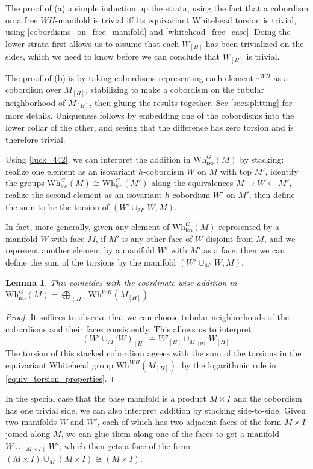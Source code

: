 \documentclass[11pt]{amsart}
\newtheorem{lem}{Lemma}[section]
\theoremstyle{definition}
\numberwithin{equation}{section}
\numberwithin{figure}{section}
\newcommand{\iso}{\mathrm{iso}}
\newcommand{\Wh}{\mathrm{Wh}}
\begin{document}
The proof of (a) a simple induction up the strata, using the fact that a cobordism on a free $WH$-manifold is trivial iff its equivariant Whitehead torsion is trivial, using \autoref{cobordisms_on_free_manifold} and \autoref{whitehead_free_case}. Doing the lower strata first allows us to assume that each $W_{[H]}$ has been trivialized on the sides, which we need to know before we can conclude that $W_{[H]}$ is trivial.

The proof of (b) is by taking cobordisms representing each element $\tau^{WH}$ as a cobordism over $M_{[H]}$, stabilizing to make a cobordism on the tubular neighborhood of $M_{[H]}$, then gluing the results together. See \autoref{sec:splitting} for more details. Uniqueness follows by embedding one of the cobordisms into the lower collar of the other, and seeing that the difference has zero torsion and is therefore trivial.

Using \autoref{luck_442}, we can interpret the addition in $\Wh^G_{\iso}(M)$ by stacking: realize one element as an isovariant $h$-cobordism $W$ on $M$ with top $M'$, identify the groups $\Wh^G_{\iso}(M) \cong \Wh^G_{\iso}(M')$ along the equivalences $M \to W \leftarrow M'$, realize the second element as an isovariant $h$-cobordism $W'$ on $M'$, then define the sum to be the torsion of $(W' \cup_{M'} W,M)$.

In fact, more generally, given any element of $\Wh^G_{\iso}(M)$ represented by a manifold $W$ with face $M$, if $M'$ is any other face of $W$ disjoint from $M$, and we represent another element by a manifold $W'$ with $M'$ as a face, then we can define the sum of the torsions by the manifold $(W' \cup_{M'} W,M)$.

\begin{lem}\label{add_in_iso_wh_top}
	This coincides with the coordinate-wise addition in $\Wh^G_{\iso}(M) = \bigoplus_{(H)} \Wh^{WH}(M_{[H]})$.
\end{lem}

\begin{proof}
	It suffices to observe that we can choose tubular neighborhoods of the cobordisms and their faces consistently. This allows us to interpret
	\[ (W' \cup_M' W)_{[H]} \cong W'_{[H]} \cup_{M'_{[H]}} W_{[H]}. \]
	The torsion of this stacked cobordism agrees with the sum of the torsions in the equivariant Whitehead group $\Wh^{WH}(M_{[H]})$, by the logarithmic rule in \autoref{equiv_torsion_properties}.
\end{proof}

In the special case that the base manifold is a product $M \times I$ and the cobordism has one trivial side, we can also interpret addition by stacking side-to-side. Given two manifolds $W$ and $W'$, each of which has two adjacent faces of the form $M \times I$ joined along $M$, we can glue them along one of the faces to get a manifold $W \cup_{(M \times I)} W'$, which then gets a face of the form $(M \times I) \cup_M (M \times I) \cong (M \times I)$.
\end{document}
